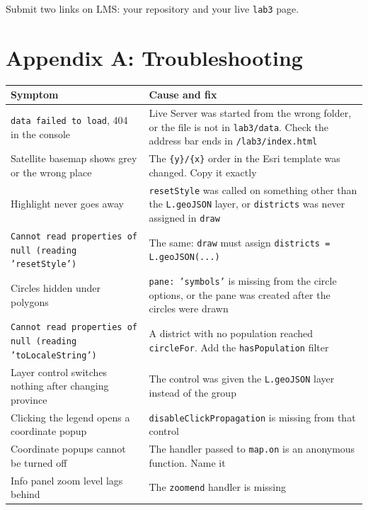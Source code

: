 \documentclass{article}
\newcommand{\cd}[1]{\texttt{#1}}
\begin{document}
\vspace{1em}
Submit two links on LMS: your repository and your live \cd{lab3} page.


\section*{Appendix A: Troubleshooting}

\begin{tabularx}{\textwidth}{@{}L{4.6cm} X@{}}
\toprule
\textbf{Symptom} & \textbf{Cause and fix} \\
\midrule
\cd{data failed to load}, 404 in the console &
  Live Server was started from the wrong folder, or the file is not in
  \cd{lab3/data}. Check the address bar ends in \cd{/lab3/index.html} \\
Satellite basemap shows grey or the wrong place &
  The \cd{\{y\}/\{x\}} order in the Esri template was changed. Copy it
  exactly \\
Highlight never goes away &
  \cd{resetStyle} was called on something other than the
  \cd{L.geoJSON} layer, or \cd{districts} was never assigned in
  \cd{draw} \\
\cd{Cannot read properties of null (reading 'resetStyle')} &
  The same: \cd{draw} must assign \cd{districts = L.geoJSON(...)} \\
Circles hidden under polygons &
  \cd{pane: 'symbols'} is missing from the circle options, or the pane
  was created after the circles were drawn \\
\cd{Cannot read properties of null (reading 'toLocaleString')} &
  A district with no population reached \cd{circleFor}. Add the
  \cd{hasPopulation} filter \\
Layer control switches nothing after changing province &
  The control was given the \cd{L.geoJSON} layer instead of the group \\
Clicking the legend opens a coordinate popup &
  \cd{disableClickPropagation} is missing from that control \\
Coordinate popups cannot be turned off &
  The handler passed to \cd{map.on} is an anonymous function. Name it \\
Info panel zoom level lags behind &
  The \cd{zoomend} handler is missing \\
\bottomrule
\end{tabularx}

\end{document}

